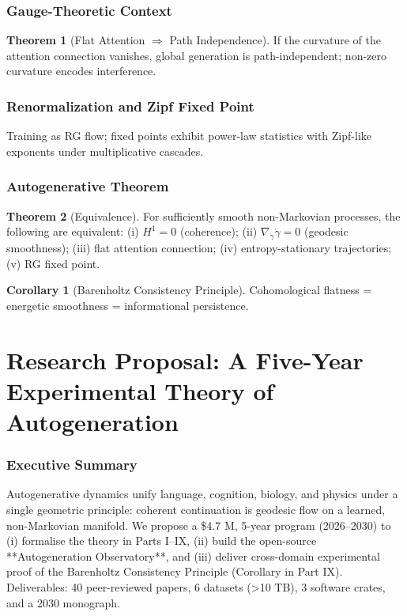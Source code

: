 \documentclass[12pt,a4paper]{article}
\theoremstyle{definition}
\newtheorem{theorem}{Theorem}[section]
\newtheorem{corollary}{Corollary}[section]
\begin{document}
\section{Gauge-Theoretic Context}
\begin{theorem}[Flat Attention $\Rightarrow$ Path Independence]
If the curvature of the attention connection vanishes, global generation is path-independent; non-zero curvature encodes interference.
\end{theorem}

\section{Renormalization and Zipf Fixed Point}
Training as RG flow; fixed points exhibit power-law statistics with Zipf-like exponents under multiplicative cascades.

\section{Autogenerative Theorem}
\begin{theorem}[Equivalence]
For sufficiently smooth non-Markovian processes, the following are equivalent: (i) $H^1=0$ (coherence); (ii) $\nabla_{\dot\gamma}\dot\gamma=0$ (geodesic smoothness); (iii) flat attention connection; (iv) entropy-stationary trajectories; (v) RG fixed point.
\end{theorem}
\begin{corollary}[Barenholtz Consistency Principle]
Cohomological flatness = energetic smoothness = informational persistence.
\end{corollary}

\part{Research Proposal: A Five-Year Experimental Theory of Autogeneration}

\section{Executive Summary}
Autogenerative dynamics unify language, cognition, biology, and physics under a single geometric principle: coherent continuation is geodesic flow on a learned, non-Markovian manifold.  
We propose a \$4.7 M, 5-year program (2026–2030) to (i) formalise the theory in Parts I–IX, (ii) build the open-source **Autogeneration Observatory**, and (iii) deliver cross-domain experimental proof of the Barenholtz Consistency Principle (Corollary in Part IX).  
Deliverables: 40 peer-reviewed papers, 6 datasets (>10 TB), 3 software crates, and a 2030 monograph.
\end{document}
